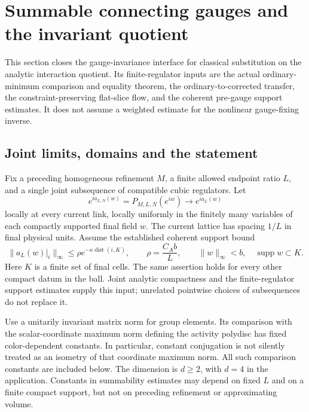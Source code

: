 \section{Summable connecting gauges and the invariant quotient}
\label{csgq-section}

This section closes the gauge-invariance interface for classical
substitution on the analytic interaction quotient. Its finite-regulator
inputs are the actual ordinary-minimum comparison and equality theorem,
the ordinary-to-corrected transfer, the constraint-preserving flat-slice
flow, and the coherent pre-gauge support estimates. It does not assume a
weighted estimate for the nonlinear gauge-fixing inverse.

\subsection{Joint limits, domains and the statement}
\label{csgq-input-section}

Fix a preceding homogeneous refinement $M$, a finite allowed endpoint
ratio $L$, and a single joint subsequence of compatible cubic regulators.
Let
\begin{equation}
 e^{ia_{L,N}(w)}=P_{M,L,N}(e^{iw})
       \longrightarrow e^{ia_L(w)}
 \label{csgq-background-limit}
\end{equation}
locally at every current link, locally uniformly in the finitely many
variables of each compactly supported final field $w$. The current
lattice has spacing $1/L$ in final physical units. Assume the established
coherent support bound
\begin{equation}
 \|a_L(w)|_i\|_\infty
 \le \rho e^{-\kappa\operatorname{dist}(i,K)},\qquad
 \rho=\frac{C_A b}{L},
 \qquad \|w\|_\infty<b,\quad \operatorname{supp}w\subset K.
 \label{csgq-background-decay}
\end{equation}
Here $K$ is a finite set of final cells. The same assertion holds for
every other compact datum in the ball. Joint analytic compactness and
the finite-regulator support estimates supply this input; unrelated
pointwise choices of subsequences do not replace it.

Use a unitarily invariant matrix norm for group elements. Its comparison
with the scalar-coordinate maximum norm defining the activity polydisc
has fixed color-dependent constants. In particular, constant conjugation
is not silently treated as an isometry of that coordinate maximum norm.
All such comparison constants are included below. The dimension is
$d\ge2$, with $d=4$ in the application. Constants in summability estimates
may depend on fixed $L$ and on a finite compact support, but not on
preceding refinement or approximating volume.

